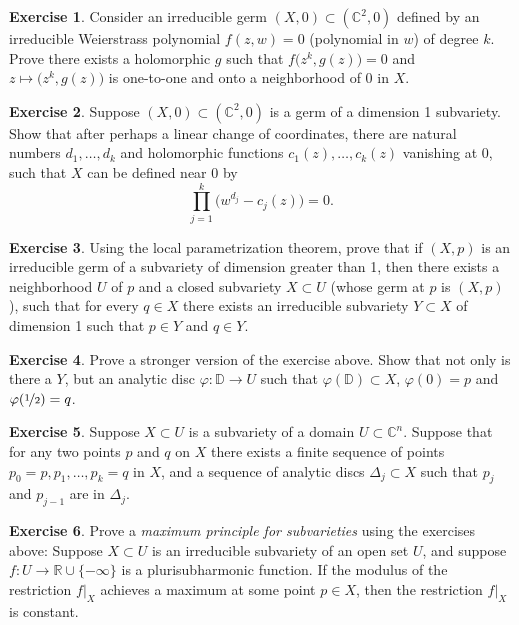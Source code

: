 \documentclass[12pt,openany]{book}
\newcommand{\C}{{\mathbb{C}}}
\newcommand{\R}{{\mathbb{R}}}
\newcommand{\D}{{\mathbb{D}}}
\theoremstyle{plain}
\theoremstyle{remark}
\theoremstyle{definition}
\newenvironment{exbox}{%
    \def\FrameCommand{\vrule width 1pt \relax\hspace{10pt}}%
    \MakeFramed {\advance \hsize -\width \FrameRestore}%
}{%
    \endMakeFramed
}
\theoremstyle{exercise}
\newtheorem{exercise}{Exercise}[section]
\theoremstyle{example}
\begin{document}
\begin{exbox}
\begin{exercise}
Consider an irreducible germ
$(X,0) \subset (\C^2,0)$ defined
by an irreducible Weierstrass polynomial $f(z,w) = 0$ (polynomial in $w$)
of degree $k$.  Prove there exists a holomorphic $g$ such that
$f\bigl(z^k,g(z)\bigr) = 0$ and $z \mapsto \bigl(z^k,g(z)\bigr)$
is one-to-one and onto a neighborhood of 0 in $X$.
\end{exercise}

\begin{exercise}
Suppose $(X,0) \subset (\C^2,0)$ is a germ of a dimension 1 subvariety.
Show that after perhaps a linear change of coordinates,
there are natural numbers
$d_1,\ldots,d_k$
and
holomorphic functions $c_1(z),\ldots,c_k(z)$ vanishing at $0$,
such that $X$ can be defined near 0 by
\begin{equation*}
\prod_{j=1}^k {\bigl( w^{d_j} - c_j(z) \bigr)} = 0.
\end{equation*}
\end{exercise}

\begin{exercise}
Using the local parametrization theorem, prove that
if $(X,p)$ is an irreducible germ of a subvariety of dimension greater
than 1, then there exists a neighborhood $U$ of $p$ and a closed subvariety
$X \subset U$ (whose germ at $p$ is $(X,p)$), such that for every
$q \in X$ there exists an irreducible subvariety $Y \subset X$
of dimension 1 such that $p \in Y$ and $q \in Y$.
\pagebreak[2]
\end{exercise}

\begin{exercise}
Prove a stronger version of the exercise above.  Show that not only is there
a $Y$, but an analytic disc $\varphi \colon \D \to U$ such that
$\varphi(\D) \subset X$, $\varphi(0) = p$ and $\varphi(\nicefrac{1}{2}) =
q$.
\end{exercise}

\begin{exercise}
Suppose $X \subset U$ is a subvariety of a domain $U \subset \C^n$.
Suppose that for any two points $p$ and $q$ on $X$ there exists a finite sequence
of points $p_0 = p, p_1, \ldots, p_k = q$ in $X$, and a sequence of analytic discs
$\Delta_j \subset X$ such that $p_{j}$ and $p_{j-1}$ are in $\Delta_j$.
\end{exercise}

\begin{exercise}\label{exercise:maxprincsubvar}
Prove a \emph{maximum principle for subvarieties} using the exercises above:
Suppose $X \subset U$ is an irreducible subvariety of an open set $U$,
and suppose $f \colon U \to \R \cup \{ - \infty \}$
is a plurisubharmonic function.  If the modulus of the restriction $f|_X$
achieves a maximum
at some point $p \in X$, then the restriction $f|_X$ is constant.
\end{exercise}


\end{exbox}
\end{document}
